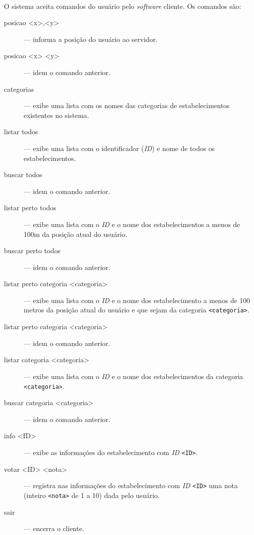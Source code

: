 \documentclass[a4paper,10pt,oneside,final,titlepage,onecolumn]{scrartcl}
\begin{document}
\paragraph{}O sistema aceita comandos do usuário pelo \emph{software} cliente. Os comandos são:
\begin{description}
 \item[posicao <x>,<y>] --- informa a posição do usuário ao servidor.
 \item[posicao <x> <y>] --- idem o comando anterior.
 \item[categorias] --- exibe uma lista com os nomes das categorias de estabelecimentos existentes no sistema.
 \item[listar todos] --- exibe uma lista com o identificador (\emph{ID}) e nome de todos os estabelecimentos.
 \item[buscar todos] --- idem o comando anterior.
 \item[listar perto todos] --- exibe uma lista com o \emph{ID} e o nome dos estabelecimentos a menos de 100m da posição atual do usuário.
 \item[buscar perto todos] --- idem o comando anterior.
 \item[listar perto categoria <categoria>] --- exibe uma lista com o \emph{ID} e o nome dos estabelecimento a menos de 100 metros da posição atual do usuário e que sejam da categoria \verb|<categoria>|.
 \item[listar perto categoria <categoria>] --- idem o comando anterior.
 \item[listar categoria <categoria>] --- exibe uma lista com o \emph{ID} e o nome dos estabelecimentos da categoria \verb|<categoria>|.
 \item[buscar categoria <categoria>] --- idem o comando anterior.
 \item[info <ID>] --- exibe as informações do estabelecimento com \emph{ID} \verb|<ID>|.
 \item[votar <ID> <nota>] --- registra nas informações do estabelecimento com \emph{ID} \verb|<ID>| uma nota (inteiro \verb|<nota>| de 1 a 10) dada pelo usuário.
 \item[sair] --- encerra o cliente.
\end{description}
\end{document}
